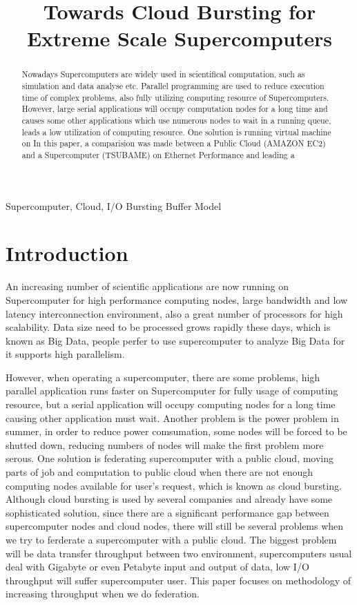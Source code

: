 \documentclass[JIP,draft]{ipsj}
\begin{document}
\title{Towards Cloud Bursting for Extreme Scale Supercomputers}

\begin{abstract}
Nowadays Supercomputers are widely used in scientifical computation, such as simulation and data analyse etc. 
Parallel programming are used to reduce execution time of complex problems, also fully utilizing computing resource of Supercomputers.
However, large serial applications will occupy computation nodes for a long time and causes some other applications which use numerous nodes to wait in a running queue, leads a low utilization of computing resource.
One solution is running virtual machine on 
In this paper, a comparision was made between a Public Cloud (AMAZON EC2) and a Supercomputer (TSUBAME) on Ethernet Performance and leading a 
\end{abstract}

\begin{keyword}
Supercomputer, Cloud, I/O Bursting Buffer Model
\end{keyword}

\maketitle

\section{Introduction}
An increasing number of scientific applications are now running on Supercomputer for high performance computing nodes, large bandwidth and low latency interconnection environment, also a great number of processors for high scalability.
Data size need to be processed grows rapidly these days, which is known as Big Data, people perfer to use supercomputer to analyze Big Data for it supports high parallelism.

However, when operating a supercomputer, there are some problems, high parallel application runs faster on Supercomputer for fully usage of computing resource, but a serial application will occupy computing nodes for a long time causing other application must wait.
Another problem is the power problem in summer, in order to reduce power comsumation, some nodes will be forced to be shutted down, reducing numbers of nodes will make the first problem more serous.
One solution is federating supercomputer with a public cloud, moving parts of job and computation to public cloud when there are not enough computing nodes available for user's request, which is known as cloud bursting.
Although cloud bursting is used by several companies and already have some sophisticated solution, since there are a significant performance gap between supercomputer nodes and cloud nodes, there will still be several problems when we try to ferderate a supercomputer with a public cloud.
The biggest problem will be data transfer throughput between two environment, supercomputers usual deal with Gigabyte or even Petabyte input and output of data, low I/O throughput will suffer supercomputer user. This paper focuses on methodology of increasing throughput when we do federation.
\end{document}
